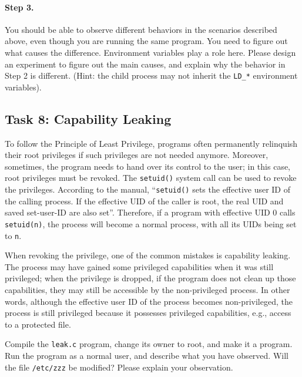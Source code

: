 \paragraph{Step 3.} 
You should be able to observe different behaviors in the scenarios
described above, even though you are running the same program.  You need 
to figure out what causes the difference. Environment variables 
play a role here. Please design an experiment to figure out the 
main causes, and explain why the behavior in Step 2 is 
different. (Hint: the child process 
may not inherit the {\tt LD\_*} environment variables). 


\subsection{Task 8: Capability Leaking}

To follow the Principle of Least Privilege, \setuid programs often
permanently relinquish their root privileges if such privileges are not
needed anymore. Moreover, sometimes, the program needs to hand over its 
control to the user; in this case, root privileges must be revoked.
The {\tt setuid()} system call can be used to revoke the privileges. 
According to the manual, ``\texttt{setuid()} sets the effective user ID of
the calling process. If the effective UID of the caller is root, the real
UID and saved set-user-ID are also set''. Therefore, if a \setuid program
with effective UID 0 calls \texttt{setuid(n)}, the process will become a
normal process, with all its UIDs being set to \texttt{n}. 

When revoking the privilege, one of the common mistakes is capability
leaking. The process may have gained some privileged capabilities when it
was still privileged; when the privilege is dropped, if the program
does not clean up those capabilities, they may still be accessible by the
non-privileged process. In other words, although the effective user ID of
the process becomes non-privileged, the process is still privileged because
it possesses privileged capabilities, e.g., access to a protected file.


Compile the {\tt leak.c} program, change its owner to root, and
make it a \setuid program. Run the program as a normal user,
and describe what you have observed.
Will the file {\tt /etc/zzz} be modified? Please explain
your observation.

